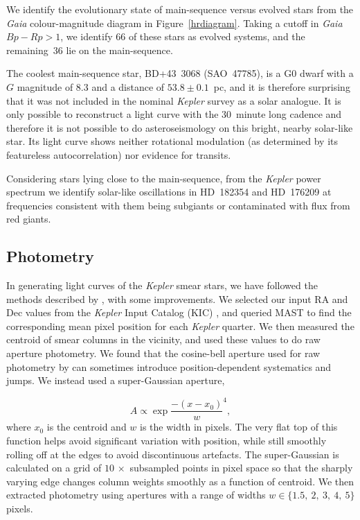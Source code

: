 \documentclass[a4paper,fleqn,usenatbib]{mnras}
\newcommand{\kepler}{\textit{Kepler}\xspace}
\newcommand{\gaia}{\textit{Gaia}\xspace}
\begin{document}
We identify the evolutionary state of main-sequence versus evolved stars from the \gaia colour-magnitude diagram in Figure~\ref{hrdiagram}. Taking a cutoff in \gaia $Bp-Rp > 1$, we identify 66 of these stars as evolved systems, and the remaining~36 lie on the main-sequence. 

The coolest main-sequence star, BD+43~3068 (SAO~47785), is a G0 dwarf with a $G$ magnitude of 8.3 and a distance of $53.8 \pm 0.1$~pc, and it is therefore surprising that it was not included in the nominal \kepler survey as a solar analogue. It is only possible to reconstruct a light curve with the 30~minute long cadence and therefore it is not possible to do asteroseismology on this bright, nearby solar-like star. Its light curve shows neither rotational modulation (as determined by its featureless autocorrelation) nor evidence for transits.

Considering stars lying close to the main-sequence, from the \kepler power spectrum we identify solar-like oscillations in HD~182354 and HD~176209 at frequencies consistent with them being subgiants or contaminated with flux from red giants. 


\subsection{Photometry}
\label{photometry}

In generating light curves of the \kepler smear stars, we have followed the methods described by \citet{smear}, with some improvements. We selected our input RA and Dec values from the \kepler Input Catalog (KIC) \citep{kic}, and queried MAST to find the corresponding mean pixel position for each \kepler quarter. We then measured the centroid of smear columns in the vicinity, and used these values to do raw aperture photometry. We found that the cosine-bell aperture used for raw photometry by \citet{smear} can sometimes introduce position-dependent systematics and jumps. We instead used a super-Gaussian aperture, 

\begin{equation}
A \propto \exp{\dfrac{-(x-x_0)}{w} ^ 4},
\end{equation}
\noindent where $x_0$ is the centroid and $w$ is the width in pixels. The very flat top of this function helps avoid significant variation with position, while still smoothly rolling off at the edges to avoid discontinuous artefacts. The super-Gaussian is calculated on a grid of $10\,\times$ subsampled points in pixel space so that the sharply varying edge changes column weights smoothly as a function of centroid. We then extracted photometry using apertures with a range of widths $w \in\{1.5,~2,~3,~4,~5\}$ pixels.
\end{document}

